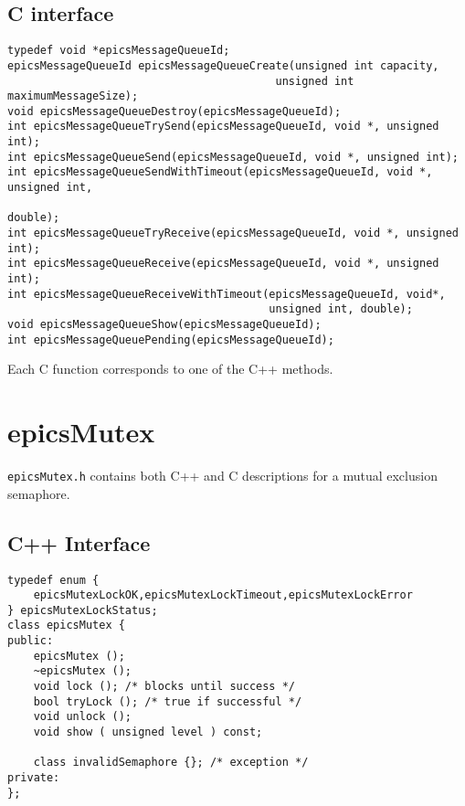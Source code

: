 \subsection{C interface}

\begin{verbatim}
typedef void *epicsMessageQueueId;
epicsMessageQueueId epicsMessageQueueCreate(unsigned int capacity,
                                         unsigned int maximumMessageSize);
void epicsMessageQueueDestroy(epicsMessageQueueId);
int epicsMessageQueueTrySend(epicsMessageQueueId, void *, unsigned int);
int epicsMessageQueueSend(epicsMessageQueueId, void *, unsigned int);
int epicsMessageQueueSendWithTimeout(epicsMessageQueueId, void *, unsigned int,
                                                                 double);
int epicsMessageQueueTryReceive(epicsMessageQueueId, void *, unsigned int);
int epicsMessageQueueReceive(epicsMessageQueueId, void *, unsigned int);
int epicsMessageQueueReceiveWithTimeout(epicsMessageQueueId, void*,
                                        unsigned int, double);
void epicsMessageQueueShow(epicsMessageQueueId);
int epicsMessageQueuePending(epicsMessageQueueId);
\end{verbatim}

Each C function corresponds to one of the C++ methods.

\section{epicsMutex}

\verb|epicsMutex.h| contains both C++ and C descriptions for a mutual exclusion semaphore.

\subsection{C++ Interface}

\begin{verbatim}
typedef enum {
    epicsMutexLockOK,epicsMutexLockTimeout,epicsMutexLockError
} epicsMutexLockStatus;
class epicsMutex {
public:
    epicsMutex ();
    ~epicsMutex ();
    void lock (); /* blocks until success */
    bool tryLock (); /* true if successful */
    void unlock ();
    void show ( unsigned level ) const;

    class invalidSemaphore {}; /* exception */
private:
};
\end{verbatim}

